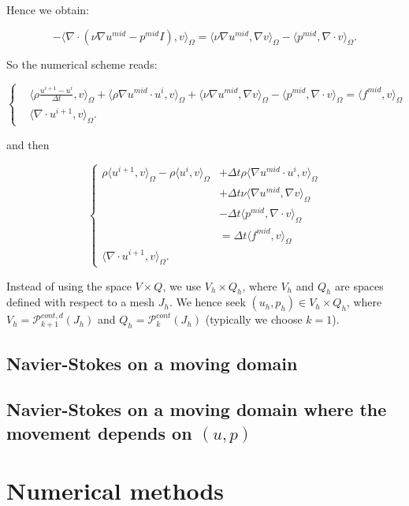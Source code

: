 \documentclass[11pt,a4paper,titlepage]{report}
\begin{document}
Hence we obtain:

\[
- \langle \nabla \cdot (\nu \nabla u^{mid} - p^{mid}I) ,v \rangle_{\Omega} = \langle \nu \nabla u^{mid}, \nabla v \rangle_\Omega -  \langle p^{mid}, \nabla \cdot v \rangle_\Omega.
\]

So the numerical scheme reads:

\[
\left\{  
\begin{aligned}
& \langle \rho \frac{u^{i+1} - u^i}{\Delta t},v \rangle_\Omega
+ \langle \rho \nabla u^{mid} \cdot u^i  ,v \rangle_\Omega
+ \langle \nu \nabla u^{mid}, \nabla v \rangle_\Omega
- \langle p^{mid} , \nabla \cdot v \rangle_\Omega = \langle f^{mid} ,v \rangle_\Omega \\
& \langle \nabla \cdot u^{i+1},v \rangle_\Omega.
\end{aligned}
\right.
\]

and then

\[
\left\{  
\begin{aligned}
\rho \langle u^{i+1},v \rangle_\Omega - \rho \langle u^i, v \rangle_\Omega & + \Delta t \rho \langle \nabla u^{mid} \cdot u^i  ,v \rangle_\Omega \\
& + \Delta t \nu \langle \nabla u^{mid}, \nabla v \rangle_\Omega \\
& - \Delta t \langle p^{mid} , \nabla \cdot v \rangle_\Omega \\
& = \Delta t \langle f^{mid} ,v \rangle_\Omega \\
\langle \nabla \cdot u^{i+1},v \rangle_\Omega.
\end{aligned}
\right.
\]

Instead of using the space $V \times Q$, we use $V_h \times Q_h$, where $V_h$ and $Q_h$ are spaces defined with respect to a mesh $J_h$. We hence seek $(u_h, p_h) \in V_h \times Q_h$, where $V_h = \mathcal{P}^{cont,d}_{k+1} (J_h)$ and $Q_h = \mathcal{P}^{cont}_{k} (J_h)$ (typically we choose $k=1$). \\

\section{Navier-Stokes on a moving domain}

\section{Navier-Stokes on a moving domain where the movement depends on $(u,p)$}

\chapter{Numerical methods}
\end{document}
